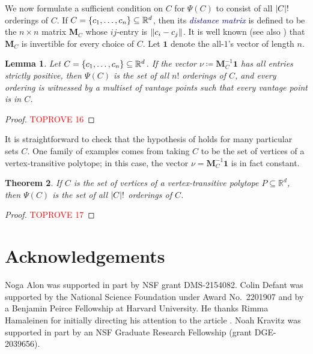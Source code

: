 \documentclass[11pt]{amsart}
\newtheorem{theorem}{Theorem}[section]
\newtheorem{lemma}[theorem]{Lemma}
\theoremstyle{definition}
\DeclarePairedDelimiter{\set}{\{}{\}}
\DeclarePairedDelimiter{\abs}{\lvert}{\rvert}
\DeclarePairedDelimiter{\Abs}{\lVert}{\rVert}
\newcommand{\RR}{\mathbb{R}}
\newcommand{\dfn}[1]{\textcolor{darkblue}{\emph{#1}}}
\begin{document}
We now formulate a sufficient condition on $C$ for $\Psi(C)$ to consist of all $\abs{C}!$ orderings of $C$.  If $C=\set{c_1, \ldots, c_n} \subseteq \RR^d$, then its \dfn{{distance matrix}} is defined to be the $n \times n$ matrix ${\mathbf M}_C$ whose $ij$-entry is $\Abs{c_i-c_j}$.  It is well known \cite{Schoenberg1937} (see also \cite{Ball1992}) that ${\mathbf M}_C$ is invertible for every choice of $C$.  Let $\mathbf{1}$ denote the all-$1$'s vector of length $n$.

\begin{lemma}\label{lem:dist-matrix}
Let $C=\set{c_1, \ldots, c_n} \subseteq \RR^d$.  If the vector $\nu\coloneqq{\mathbf M}_C^{-1}{\mathbf 1}$ has all entries strictly positive, then $\Psi(C)$ is the set of all $n!$ orderings of $C$, and every ordering is witnessed by a multiset of vantage points such that every vantage point is in $C$.
\end{lemma}

\begin{proof}\textcolor{red}{TOPROVE 16}\end{proof}

It is straightforward to check that the hypothesis of  holds for many particular sets $C$.  One family of examples comes from taking $C$ to be the set of vertices of a vertex-transitive polytope; in this case, the vector $\nu={\mathbf M}_C^{-1}{\mathbf 1}$ is in fact constant.

\begin{theorem}\label{thm:polytope}
If $C$ is the set of vertices of a vertex-transitive polytope $P \subseteq \RR^d$, then $\Psi(C)$ is the set of all $\abs{C}!$ orderings of $C$.
\end{theorem}
\begin{proof}\textcolor{red}{TOPROVE 17}\end{proof}

\section*{Acknowledgements}
Noga Alon was supported in part by NSF grant DMS-2154082. Colin Defant was supported by the National Science Foundation under Award No.\ 2201907 and by a Benjamin Peirce Fellowship at Harvard University. He thanks Rimma Hamaleinen for initially directing his attention to the article \cite{Carbonero2021}.  Noah Kravitz was supported in part by an NSF Graduate Research Fellowship (grant DGE-2039656).

\printbibliography
\end{document}
